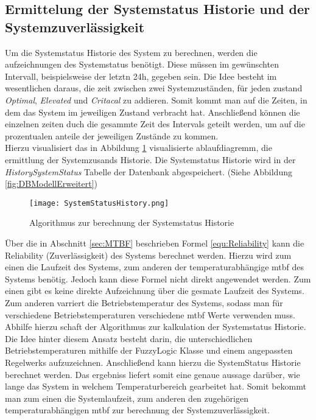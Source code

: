 \subsection{Ermittelung der Systemstatus Historie und der Systemzuverlässigkeit}
Um die Systemstatus Historie des System zu berechnen, werden die aufzeichnungen des Systemstatus benötigt. Diese müssen im gewünschten Intervall, beispielsweise der letztn 24h, gegeben sein.
Die Idee besteht im wesentlichen daraus, die zeit zwischen zwei Systemzuständen, für jeden zustand \textit{Optimal}, \textit{Elevated} und \textit{Critacal} zu addieren. Somit kommt man auf die Zeiten, in dem das System im jeweiligen Zustand verbracht hat. Anschließend können die einzelnen zeiten duch die gesammte Zeit des Intervals geteilt werden, um auf die prozentualen anteile der jeweiligen Zustände zu kommen.\\
Hierzu visualisiert das in Abbildung \ref{fig:SystemStatusHistoryAlgorythmus} visualisierte ablaufdiagremm, die ermittlung der Systemzusands Historie. Die Systemstatus Historie wird in der \textit{HistorySystemStatus} Tabelle der Datenbank abgespeichert. (Siehe Abbildung \ref{fig:DBModellErweitert})
\begin{center}
    \begin{figure}[h!]
        \centering
        \texttt{[image: SystemStatusHistory.png]}
        \caption{Algorithmus zur berechnung der Systemstatus Historie}
        \label{fig:SystemStatusHistoryAlgorythmus}
    \end{figure}
\end{center}
\vspace{-1cm}
Über die in Abschnitt \ref{sec:MTBF} beschrieben Formel \ref{equ:Reliability} kann die  Reliability (Zuverlässigkeit) des Systems berechnet werden. Hierzu wird zum einen die Laufzeit des Systems, zum anderen der temperaturabhängige \ac{mtbf} des Systems benötig. Jedoch kann diese Formel nicht direkt angewendet werden. Zum einen gibt es keine direkte Aufzeichnung über die gesmate Laufzeit des Systems. Zum anderen varriert die Betriebstemperatur des Systems, sodass man für verschiedene Betriebstemperaturen verschiedene \ac{mtbf} Werte verwenden muss.\\
Abhilfe hierzu schaft der Algorithmus zur kalkulation der Systemstatus Historie. Die Idee hinter diesem Ansatz besteht darin, die unterschiedlichen Betriebstemperaturen mithilfe der FuzzyLogic Klasse und einem angepassten Regelwerks aufzuzeichnen. Anschließend kann hierzu die SystemStatus Historie berechnet werden. Das ergebniss liefert somit eine genaue aussage darüber, wie lange das System in welchem Temperaturbereich gearbeitet hat. Somit bekommt man zum einen die Systemlaufzeit, zum anderen den zugehörigen temperaturabhängigen \ac{mtbf} zur berechnung der Systemzuverlässigkeit.\\ 
